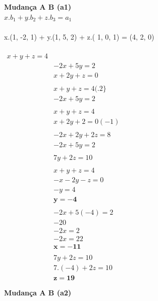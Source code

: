 \documentclass{article}
\begin{document}
\\\\
\textbf{Mudança A \rightarrow B (a1)
\\$x. b_1 + y. b_2 + z. b_3 = a_1 $\\\\}
x.(1, -2, 1) + y.(1, 5, 2) + z.( 1, 0, 1) = (4, 2, 0) \\\\
$\begin{align}
x+y+z=4 \\&
-2 x+5 y=2 \\&
x+2 y+z=0 \\\\&
x+y+z=4(.2\} \\&
-2 x+5 y=2 \\\\&
x+y+z=4 \\&
x+2 y+2=0 (-1)\\\\&
-2 x+2 y+2 z=8 \\&
-2 x+5 y=2 \\\\&
7 y+2 z=10 \\\\&
x+y+z=4 \\&
-x-2 y-z=0 \\&
-y=4 \\&
\mathbf{y=-4} \\\\&
-2 x+5(-4)=2 \\&
-20 \\&
-2 x=2 \\&
-2 x = 22\\&
\mathbf{x = -11}\\\\&
7y + 2z = 10\\&
7.(-4)+ 2z = 10\\&
\mathbf{z = 19}\\\\&
\end{align}$
\\
\textbf{Mudança A \rightarrow B (a2)}\\\\
\end{document}
